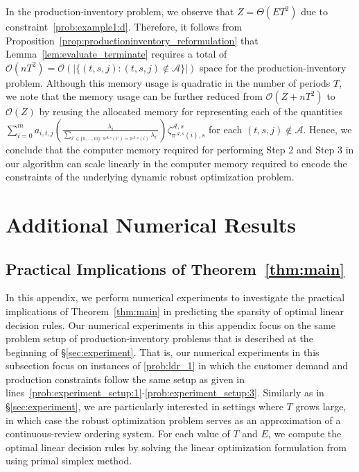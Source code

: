 \documentclass[nonblindrev,mnsc]{informs3} %
\begin{document}
\begin{APPENDICES}
In the production-inventory problem, we observe that $Z = \Theta(ET^2)$ due to constraint~\eqref{prob:example1:d}. Therefore, it follows from Proposition~\ref{prop:productioninventory_reformulation} that Lemma~\ref{lem:evaluate_terminate} requires a total of $\mathcal{O}(nT^2) = \mathcal{O}(| \{ (t,s,j): (t,s,j) \notin \mathcal{A} \}|)$ space for the production-inventory problem. Although this memory usage is quadratic in the number of periods $T$, we note that the memory usage can be further reduced from $\mathcal{O}(Z + nT^2)$  to $\mathcal{O}(Z)$ by reusing the allocated memory for representing each of the quantities $\sum_{i=0}^m   a_{i,t,j} \left( \frac{\lambda_i}{\sum_{i' \in \{0,\ldots,m\}: \pi^{\mathcal{A},s}(i') = \pi^{\mathcal{A},s}(i)} \lambda_{i'}} \right) \zeta^{\mathcal{A},s}_{\pi^{\mathcal{A},s}(i),s}$  for each $(t,s,j) \notin \mathcal{A}$.  Hence, we conclude that the computer memory required for performing Step 2 and Step 3 in our algorithm can scale linearly in the computer memory required to encode the constraints of the underlying dynamic robust optimization problem. 















\section{Additional Numerical Results} \label{appx:numerical}

\subsection{Practical Implications of Theorem~\ref{thm:main}} \label{appx:numerical:implications}

In this appendix, we perform numerical experiments to investigate the practical implications of Theorem~\ref{thm:main} in predicting the sparsity of optimal linear decision rules. Our numerical experiments in this appendix focus on the same problem setup  of production-inventory problems that is described at the beginning of  \S\ref{sec:experiment}. That is, our numerical experiments in this subsection focus on instances of \eqref{prob:ldr_1} in which the customer demand and production constraints follow the same setup as given in lines~\eqref{prob:experiment_setup:1}-\eqref{prob:experiment_setup:3}.  Similarly as in \S\ref{sec:experiment}, we are   particularly interested in settings where  $T$ grows large, in which case the robust optimization problem serves as an approximation of a continuous-review ordering system.   For each value of $T$ and $E$, we compute the optimal linear decision rules by solving the linear optimization formulation from \cite[Equation (39)]{ben2004adjustable} using primal simplex method.  


\end{APPENDICES}
\end{document}
